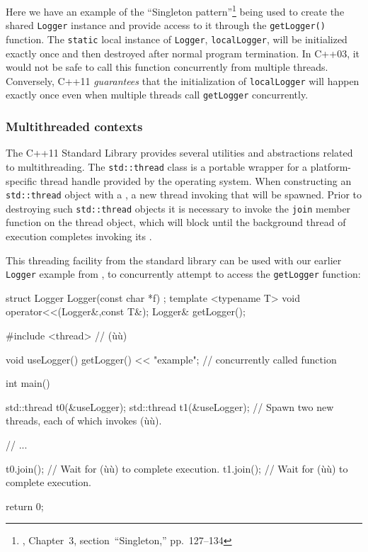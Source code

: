 Here we have an example of the ``Singleton pattern''\footnote{\cite{gamma95}, Chapter~3, section~``Singleton,'' pp.~127--134} being used to create the shared \lstinline!Logger! instance
and provide access to it through the \lstinline!getLogger()! function.  The \lstinline!static! local
instance of \lstinline!Logger!, \lstinline!localLogger!, will be initialized exactly once and then
destroyed after normal program termination.  In C++03, it would not be safe to call
this function concurrently from multiple threads.
Conversely, C++11 \emph{guarantees} that the initialization
of \lstinline!localLogger! will happen exactly once even when multiple threads call
\lstinline!getLogger! \mbox{concurrently}.

\subsubsection[Multithreaded contexts]{Multithreaded contexts}\label{multithreaded-contexts}

The C++11 Standard Library provides several utilities and abstractions related
to multi\-threading. The \lstinline!std::thread! class is a portable
wrapper for a platform-specific thread handle provided by the
operating system. When constructing an \lstinline!std::thread! object
with a , a new thread
invoking that  will be spawned.   Prior to destroying such
\lstinline!std::thread! objects it is necessary to invoke the
\lstinline!join! member function on the thread object, which will block until
the background thread of execution completes invoking its .

This threading facility from the standard library can be used
with our earlier \lstinline!Logger! example from ,
to concurrently attempt to access the \lstinline!getLogger! function:

\begin{emcppshiddenlisting}[emcppsbatch={e6,e15}]
struct Logger {
  Logger(const char *f) {}
};
template <typename T>
void operator<<(Logger&,const T&);
Logger& getLogger();
\end{emcppshiddenlisting}
\begin{emcppslisting}[emcppsbatch=e6]
#include <thread>  // (ù{}ù)

void useLogger() { getLogger() << "example"; }  // concurrently called function

int main()
{
    std::thread t0(&useLogger);
    std::thread t1(&useLogger);
        // Spawn two new threads, each of which invokes (ù{}ù).

    // ...

    t0.join();  // Wait for (ù{}ù) to complete execution.
    t1.join();  // Wait for (ù{}ù) to complete execution.

    return 0;
}
\end{emcppslisting}


